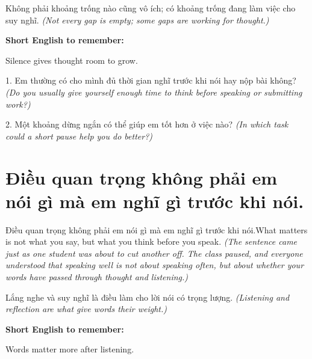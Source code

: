 \begin{baihoc}
Không phải khoảng trống nào cũng vô ích; có khoảng trống đang làm việc cho suy nghĩ.
\textit{(Not every gap is empty; some gaps are working for thought.)}
\end{baihoc}

\begin{ghinhoanh}
\textbf{Short English to remember:}

Silence gives thought room to grow.

\end{ghinhoanh}

\begin{tuhocnhanh}
1. Em thường có cho mình đủ thời gian nghĩ trước khi nói hay nộp bài không? \textit{(Do you usually give yourself enough time to think before speaking or submitting work?)}

2. Một khoảng dừng ngắn có thể giúp em tốt hơn ở việc nào? \textit{(In which task could a short pause help you do better?)}
\end{tuhocnhanh}
\ngancach


\section{Điều quan trọng không phải em nói gì mà em nghĩ gì trước khi nói.}
\begin{truyen}{Điều quan trọng không phải em nói gì mà em nghĩ gì trước khi nói.}{What matters is not what you say, but what you think before you speak.}
\textit{(The sentence came just as one student was about to cut another off. The class paused, and everyone understood that speaking well is not about speaking often, but about whether your words have passed through thought and listening.)}
\end{truyen}

\begin{baihoc}
Lắng nghe và suy nghĩ là điều làm cho lời nói có trọng lượng.
\textit{(Listening and reflection are what give words their weight.)}
\end{baihoc}

\begin{ghinhoanh}
\textbf{Short English to remember:}

Words matter more after listening.

\end{ghinhoanh}

